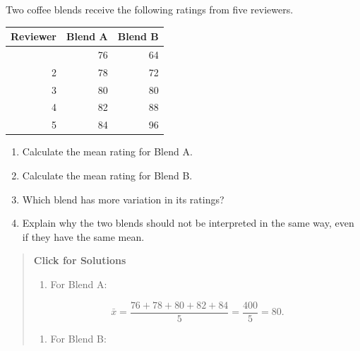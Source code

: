 \documentclass[
  letterpaper,
  DIV=11,
  numbers=noendperiod]{scrreprt}
\newcounter{none} %
\providecommand{\tightlist}{%
  \setlength{\itemsep}{0pt}\setlength{\parskip}{0pt}}
\begin{document}
\begin{tcolorbox}
\end{tcolorbox}

\begin{tcolorbox}[enhanced jigsaw, arc=.35mm, bottomrule=.15mm, bottomtitle=1mm, breakable, colback=white, colbacktitle=quarto-callout-note-color!10!white, colframe=quarto-callout-note-color-frame, coltitle=black, left=2mm, leftrule=.75mm, opacityback=0, opacitybacktitle=0.6, rightrule=.15mm, title=\textcolor{quarto-callout-note-color}{\faInfo}\hspace{0.5em}{Question 5}, titlerule=0mm, toprule=.15mm, toptitle=1mm]

Two coffee blends receive the following ratings from five reviewers.

{\def\LTcaptype{none} %
\begin{longtable}[]{@{}rrr@{}}
\toprule\noalign{}
Reviewer & Blend A & Blend B \\
\midrule\noalign{}
\endhead
\bottomrule\noalign{}
\endlastfoot
1 & 76 & 64 \\
2 & 78 & 72 \\
3 & 80 & 80 \\
4 & 82 & 88 \\
5 & 84 & 96 \\
\end{longtable}
}

\begin{enumerate}
\def\labelenumi{\alph{enumi}.}
\item
  Calculate the mean rating for Blend A.
\item
  Calculate the mean rating for Blend B.
\item
  Which blend has more variation in its ratings?
\item
  Explain why the two blends should not be interpreted in the same way,
  even if they have the same mean.
\end{enumerate}

\begin{quote}
\textbf{Click for Solutions}

\begin{enumerate}
\def\labelenumi{\alph{enumi}.}
\tightlist
\item
  For Blend A:
\end{enumerate}

\[
\bar{x}
=
\frac{76 + 78 + 80 + 82 + 84}{5}
=
\frac{400}{5}
=
80.
\]

\begin{enumerate}
\def\labelenumi{\alph{enumi}.}
\setcounter{enumi}{1}
\tightlist
\item
  For Blend B:
\end{enumerate}


\end{quote}
\end{tcolorbox}
\end{document}
